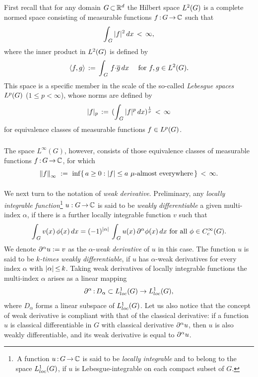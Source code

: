 \documentclass[11pt,twoside]{article}
\def\G{G}
\begin{document}
\begin{itemize}[leftmargin=4mm]
\subparagraph{} %
First recall that
for any domain $\G \xsubset \Rd$
the Hilbert space $\Lh$ is a complete normed space
consisting of measurable functions $f \: \G \xto \C$ such that
\[
\int_{\,\G} \, \abs{f} ^2 \, dx \, < \, \infty,
\]
where the inner product in $\Lh$ is defined by
\[
\scalar{f}{g} \eqdef \int_{\,\G} \, f {\cdot} \overline{g} \, dx
\quad \for f,g \in \Lh.
\]
This space is a specific member in the scale of the so-called
\textit{Lebesgue spaces} $\Lp$ ($1 \leq p < \infty$),
whose norms are defined by
\[
\abs{f} _p \eqdef ( \int_{\,\G} \, \abs{f} ^p \, dx)^{\frac{1}{p}} \,<\,\infty
\]
for equivalence classes of measurable functions $f \in \Lp$.

\subparagraph{}
The space $L^{\infty}(\G)$,
however,
consists of those equivalence classes of 
measurable functions $f \: \G \xto \C$,
for which 
\[
\norm{f}_{\infty} \, \eqdef \, \inf
\{\,a \geq 0: \abs{f} \leq a \,\, \mu \mbox{-almost everywhere}\,\}
\,<\,\infty.
\]

\paragraph{} %
We next turn to the notation of \textit{weak derivative}.
Preliminary,
any \textit{locally integrable function}\footnote{
\,A function $u\:\G \xto \C$ is said to be \textit{locally integrable}
and to belong to the space $\Lc$,
if $u$ is Lebesgue-integrable on each compact subset of $\G$.}
$u:\G \xto \C$ is said to be \textit{weakly differentiable} 
{\wrt} a given multi-index $\alpha$,
if there is a further locally integrable function $v$ such that
\[
\int_{\,\G} v(x) \, \phi(x) \, dx
=
(-1)^{ \abs{\alpha} } \,
\int_{\,\G} u(x) \, \PA \phi(x) \, dx
\fa \phi \in \TF.
\]
We denote $\partial^{\alpha} u := v$ as the $\alpha$-\textit{weak derivative} of $u$
in this case.
The function $u$ is said to be \textit{$k$-times weakly differentiable},
if $u$ has $\alpha$-weak derivatives
for every index $\alpha$ with $\abs{\alpha} \,{\leq}\, k$.
Taking weak derivatives of locally integrable functions {\wrt} the multi-index
$\alpha$ arises as a linear mapping
\[
\PA \: D_{\alpha} \subset \Lc \to \Lc,
\]
where $D_{\alpha}$ forms a linear subspace of $\Lc$.
Let us also notice that
the concept of weak derivative is compliant
with that of the classical derivative:
if a function $u$ is classical differentiable in $\G$
with classical derivative $\partial^{\alpha} u$,
then $u$ is also weakly differentiable,
and its weak derivative is equal to $\partial^{\alpha} u$.


\end{itemize}
\end{document}
